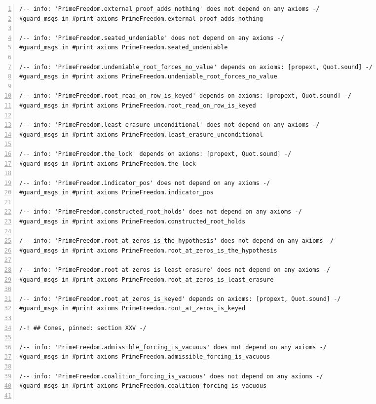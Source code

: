 \documentclass[10pt]{article}
\newcommand{\leansize}{\fontsize{5.5pt}{6.75pt}\selectfont}
\begin{document}
\begin{multicols}{2}
\begin{Verbatim}[numbers=left,firstnumber=1,numbersep=3pt,xleftmargin=2.6em,breaklines=true,breakanywhere=true,breakautoindent=false,breakindent=1.4em,breaksymbolleft={},breakanywheresymbolpre={},fontsize=\leansize]
/-- info: 'PrimeFreedom.external_proof_adds_nothing' does not depend on any axioms -/
#guard_msgs in #print axioms PrimeFreedom.external_proof_adds_nothing

/-- info: 'PrimeFreedom.seated_undeniable' does not depend on any axioms -/
#guard_msgs in #print axioms PrimeFreedom.seated_undeniable

/-- info: 'PrimeFreedom.undeniable_root_forces_no_value' depends on axioms: [propext, Quot.sound] -/
#guard_msgs in #print axioms PrimeFreedom.undeniable_root_forces_no_value

/-- info: 'PrimeFreedom.root_read_on_row_is_keyed' depends on axioms: [propext, Quot.sound] -/
#guard_msgs in #print axioms PrimeFreedom.root_read_on_row_is_keyed

/-- info: 'PrimeFreedom.least_erasure_unconditional' does not depend on any axioms -/
#guard_msgs in #print axioms PrimeFreedom.least_erasure_unconditional

/-- info: 'PrimeFreedom.the_lock' depends on axioms: [propext, Quot.sound] -/
#guard_msgs in #print axioms PrimeFreedom.the_lock

/-- info: 'PrimeFreedom.indicator_pos' does not depend on any axioms -/
#guard_msgs in #print axioms PrimeFreedom.indicator_pos

/-- info: 'PrimeFreedom.constructed_root_holds' does not depend on any axioms -/
#guard_msgs in #print axioms PrimeFreedom.constructed_root_holds

/-- info: 'PrimeFreedom.root_at_zeros_is_the_hypothesis' does not depend on any axioms -/
#guard_msgs in #print axioms PrimeFreedom.root_at_zeros_is_the_hypothesis

/-- info: 'PrimeFreedom.root_at_zeros_is_least_erasure' does not depend on any axioms -/
#guard_msgs in #print axioms PrimeFreedom.root_at_zeros_is_least_erasure

/-- info: 'PrimeFreedom.root_at_zeros_is_keyed' depends on axioms: [propext, Quot.sound] -/
#guard_msgs in #print axioms PrimeFreedom.root_at_zeros_is_keyed

/-! ## Cones, pinned: section XXV -/

/-- info: 'PrimeFreedom.admissible_forcing_is_vacuous' does not depend on any axioms -/
#guard_msgs in #print axioms PrimeFreedom.admissible_forcing_is_vacuous

/-- info: 'PrimeFreedom.coalition_forcing_is_vacuous' does not depend on any axioms -/
#guard_msgs in #print axioms PrimeFreedom.coalition_forcing_is_vacuous


\end{Verbatim}
\end{multicols}
\end{document}
